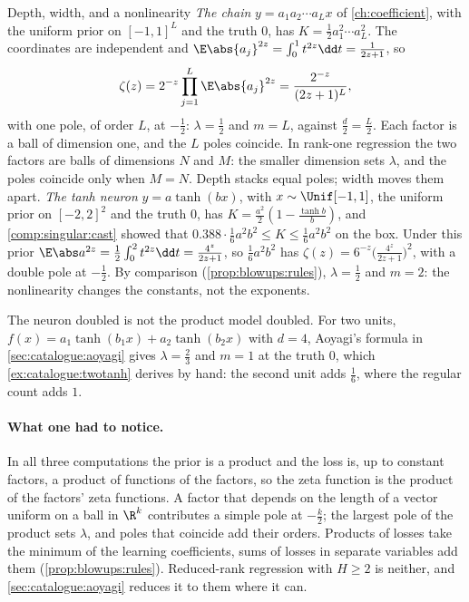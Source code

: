 \begin{refsection}
\begin{computation}{Depth, width, and a nonlinearity}\label{comp:catalogue:chain}
\step \emph{The chain} $y=a_1a_2\cdots a_Lx$ of \cref{ch:coefficient}, with the uniform prior on $[-1,1]^L$ and the truth $0$, has $K=\tfrac12a_1^2\cdots a_L^2$. The coordinates are independent and $\E\abs{a_j}^{2z}=\int_0^1t^{2z}\dd t=\frac1{2z+1}$, so
\[
\zeta(z)=2^{-z}\prod_{j=1}^L\E\abs{a_j}^{2z}=\frac{2^{-z}}{(2z+1)^L},
\]
with one pole, of order $L$, at $-\tfrac12$: $\lambda=\tfrac12$ and $m=L$, against $\tfrac d2=\tfrac L2$. Each factor is a ball of dimension one, and the $L$ poles coincide. In rank-one regression the two factors are balls of dimensions $N$ and $M$: the smaller dimension sets $\lambda$, and the poles coincide only when $M=N$. Depth stacks equal poles; width moves them apart.
\step \emph{The tanh neuron} $y=a\tanh(bx)$, with $x\sim\Unif[-1,1]$, the uniform prior on $[-2,2]^2$ and the truth $0$, has $K=\frac{a^2}2(1-\frac{\tanh b}b)$, and \cref{comp:singular:cast} showed that $0.388\cdot\frac16a^2b^2\le K\le\frac16a^2b^2$ on the box. Under this prior $\E\abs a^{2z}=\frac12\int_0^2t^{2z}\dd t=\frac{4^z}{2z+1}$, so $\frac16a^2b^2$ has $\zeta(z)=6^{-z}\bigl(\frac{4^z}{2z+1}\bigr)^2$, with a double pole at $-\tfrac12$. By comparison (\cref{prop:blowups:rules}), $\lambda=\tfrac12$ and $m=2$: the nonlinearity changes the constants, not the exponents.
\end{computation}

The neuron doubled is not the product model doubled. For two units, $f(x)=a_1\tanh(b_1x)+a_2\tanh(b_2x)$ with $d=4$, Aoyagi's formula in \cref{sec:catalogue:aoyagi} gives $\lambda=\tfrac23$ and $m=1$ at the truth $0$, which \cref{ex:catalogue:twotanh} derives by hand: the second unit adds $\tfrac16$, where the regular count adds $1$.

\paragraph{What one had to notice.} In all three computations the prior is a product and the loss is, up to constant factors, a product of functions of the factors, so the zeta function is the product of the factors' zeta functions. A factor that depends on the length of a vector uniform on a ball in $\R^k$ contributes a simple pole at $-\frac k2$; the largest pole of the product sets $\lambda$, and poles that coincide add their orders. Products of losses take the minimum of the learning coefficients, sums of losses in separate variables add them (\cref{prop:blowups:rules}). Reduced-rank regression with $H\ge2$ is neither, and \cref{sec:catalogue:aoyagi} reduces it to them where it can.


\end{refsection}
